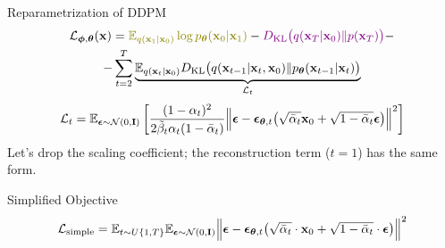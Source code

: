 \documentclass{beamer}
\begin{document}
\begin{frame}{Reparametrization of DDPM}
    \begin{multline*}
        \cL_{\bphi, \btheta}(\bx) =  {\color{olive}\bbE_{q(\bx_1 | \bx_0)} \log \pt(\bx_0 | \bx_1)} - {\color{violet}\KL\bigl(q(\bx_T | \bx_0) \| p(\bx_T)\bigr)} - \\
        - \sum_{t=2}^T \underbrace{ \bbE_{q(\bx_t | \bx_0)} \KL \bigl(q(\bx_{t-1} | \bx_t, \bx_0) \| \pt(\bx_{t-1} | \bx_t)\bigr)}_{\cL_t}
    \end{multline*}
    \eqpause
    \vspace{-0.3cm}
    \[
        \mathcal{L}_t  = \mathbb{E}_{\boldsymbol{\epsilon} \sim \mathcal{N}(0, \mathbf{I})} \left[ \frac{(1 - \alpha_t)^2}{2\tilde{\beta}_t \alpha_t (1 - \bar{\alpha}_t)} \Bigl\| \boldsymbol{\epsilon} - \boldsymbol{\epsilon}_{\boldsymbol{\theta}, t}\bigl( \sqrt{\bar{\alpha}_t} \mathbf{x}_0 + \sqrt{1 - \bar{\alpha}_t} \boldsymbol{\epsilon}\bigr) \Bigr\|^2 \right]
    \]
    \eqpause
    Let's drop the scaling coefficient; the reconstruction term ($t = 1$) has the same form.
    \begin{block}{Simplified Objective}
        \vspace{-0.3cm}
        \[
             \mathcal{L}_{\text{simple}} = \mathbb{E}_{t \sim U\{1, T\}} \mathbb{E}_{\boldsymbol{\epsilon} \sim \mathcal{N}(0, \mathbf{I})} \Bigl\| \boldsymbol{\epsilon} - \boldsymbol{\epsilon}_{\boldsymbol{\theta}, t}\bigl( \sqrt{\bar{\alpha}_t} \cdot \mathbf{x}_0 + \sqrt{1 - \bar{\alpha}_t} \cdot \boldsymbol{\epsilon}\bigr) \Bigr\|^2 
        \]
    \end{block}
\end{frame}
\end{document}
